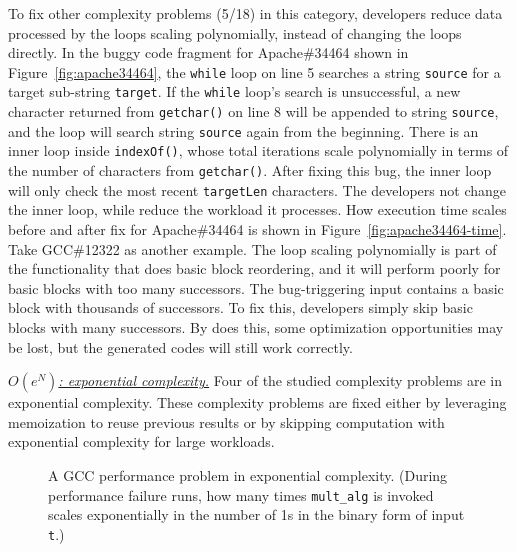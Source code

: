 To fix other complexity problems (5/18) in this category,
developers reduce data processed by the loops scaling polynomially, 
instead of changing the loops directly.
In the buggy code fragment for Apache\#34464 shown in Figure~\ref{fig:apache34464},
the \texttt{while} loop on line 5 searches a string \texttt{source}
for a target sub-string \texttt{target}.
If the \texttt{while} loop's search is unsuccessful, 
a new character returned from \texttt{getchar()} on line 8 will be appended to string \texttt{source}, 
and the loop will search string \texttt{source} again from the beginning. 
There is an inner loop inside \texttt{indexOf()}, whose total iterations 
scale polynomially in terms of the number of characters from \texttt{getchar()}. 
After fixing this bug, the inner loop will only check the most recent \texttt{targetLen} characters.
The developers not change the inner loop, 
while reduce the workload it processes.   
How execution time scales before and after fix for 
Apache\#34464 is shown in Figure~\ref{fig:apache34464-time}.
Take GCC\#12322 as another example.
The loop scaling polynomially is part of the functionality that does basic block reordering,
and it will perform poorly for basic blocks with too many successors. 
The bug-triggering input contains a basic block with thousands of successors. 
To fix this, developers simply skip basic blocks with many successors.
By does this, some optimization opportunities may be lost, 
but the generated codes will still work correctly. 


{\underline{\textit{$O(e^N)$: exponential complexity.}}}
Four of the studied complexity problems are in exponential complexity. 
These complexity problems are fixed 
either by leveraging memoization to reuse previous results 
or by skipping computation with exponential complexity for large workloads. 



\begin{figure}
\centering
{}
  \mbox{}
\caption{A GCC performance problem in exponential complexity. 
 \footnotesize{(During performance failure runs, how many times \texttt{mult\_alg} is invoked scales exponentially
  in the number of 1s in the binary form of input \texttt{t}.)}}
\vspace{-0.05in}
\label{fig:gcc27733}
\vspace{-0.05in}
\end{figure}


